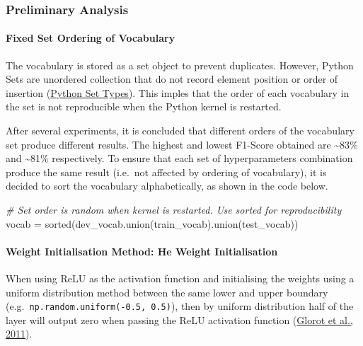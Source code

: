 \documentclass[11pt]{article}
\newenvironment{Shaded}{}{}
\newcommand{\CommentTok}[1]{\textcolor[rgb]{0.38,0.63,0.69}{\textit{{#1}}}}
\newcommand{\NormalTok}[1]{{#1}}
\newcommand{\OperatorTok}[1]{\textcolor[rgb]{0.40,0.40,0.40}{{#1}}}
\newcommand{\BuiltInTok}[1]{{#1}}
\begin{document}
\hypertarget{preliminary-analysis}{%
\subsubsection{Preliminary Analysis}\label{preliminary-analysis}}

\hypertarget{fixed-set-ordering-of-vocabulary}{%
\paragraph{Fixed Set Ordering of
Vocabulary}\label{fixed-set-ordering-of-vocabulary}}

The vocabulary is stored as a set object to prevent duplicates. However,
Python Sets are unordered collection that do not record element position
or order of insertion
(\href{https://docs.python.org/3.8/library/stdtypes.html\#set-types-set-frozenset}{Python
Set Types}). This imples that the order of each vocabulary in the set is
not reproducible when the Python kernel is restarted.

After several experiments, it is concluded that different orders of the
vocabulary set produce different results. The highest and lowest
F1-Score obtained are \textasciitilde83\% and \textasciitilde81\%
respectively. To ensure that each set of hyperparameters combination
produce the same result (i.e.~not affected by ordering of vocabulary),
it is decided to sort the vocabulary alphabetically, as shown in the
code below.

\begin{Shaded}
\begin{Highlighting}[]
\CommentTok{\# Set order is random when kernel is restarted. Use \textasciigrave{}sorted\textasciigrave{} for reproducibility}
\NormalTok{vocab }\OperatorTok{=} \BuiltInTok{sorted}\NormalTok{(dev\_vocab.union(train\_vocab).union(test\_vocab))}
\end{Highlighting}
\end{Shaded}

\hypertarget{weight-initialisation-method-he-weight-initialisation}{%
\paragraph{Weight Initialisation Method: He Weight
Initialisation}\label{weight-initialisation-method-he-weight-initialisation}}

When using ReLU as the activation function and initialising the weights
using a uniform distribution method between the same lower and upper
boundary (e.g.~\texttt{np.random.uniform(-0.5,\ 0.5)}), then by uniform
distribution half of the layer will output zero when passing the ReLU
activation function
(\href{http://proceedings.mlr.press/v15/glorot11a/glorot11a.pdf}{Glorot
et al., 2011}).
\end{document}

